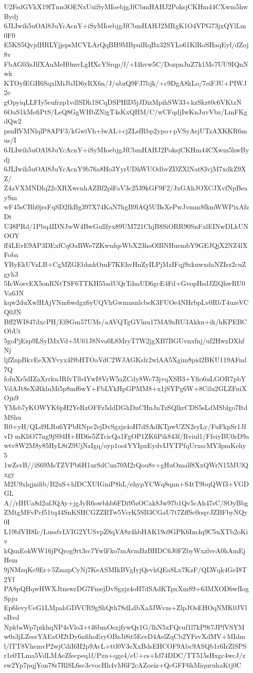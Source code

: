U2FsdGVkX19fTms3OENxUuiSyMIoebjgJfCbmHAHJ2PoksjCKHm44CXwm5hwBydj
6JLIwih5uOAl8JuYcAcnY+iSyMIoebjgJfCbmHAHJ2MRgK1O4VPG73jxQYlLm0F0
E5KS5QvjdHRLYjjspsMCVLArQqBH9MBpulRqBx32SYLo61KlRoSHaqEyf/dZoj8v
FbAG03zJlfXAuMeH0mvLgHXcYSrqp/f/+I4hvw5C/DozpnJnZ7k1Mc7UU9IQnNwk
KTOyfEGH6SqxlMiJbJD6yRX6n/J/ubzQ9FJ7bjk/+c9DgA8kLo/7eiFJU+PIWJ2e
gOpyiqLLFIy5eufrzp1vdlSDh1SCqDSPHlD5jJDizMpihSW33+kzSkzt0c6VKtzN
6OaS1kMefiPtS/LeQ8GgWHbZNigT4sKxQHM/C/wCFqdjIwKnJuvVbz/LmFKgdQw2
psnRVMNlqlP8APF3/kGwiVh+lwAL+cjZLsfRbp2ypo+pVSyAejUTzAXKKR6mus/I
6JLIwih5uOAl8JuYcAcnY+iSyMIoebjgJfCbmHAHJ2PoksjCKHm44CXwm5hwBydj
6JLIwih5uOAl8JuYcAcnY9b76a8Ho3YyrUDhWUOdbvZDZXlNat83vjM7xdkZ9XZ/
Z4aVXMNDlq22cXRXwcnhAZBf2plFaV3c2539kGF9F2/JxGAhJOXCJXvfNpBeaySm
wF45sCBh0jrsFqSD2fkBg397X74KaN7hgB9lAQ5UBsXePwJvmm8fkmWWPixAfzDt
U38PRd/1Pbq4IDNJwW4BwGullfyx89UM721ChjB8SiORR90SnFxlEINwDLkUNOOY
ff4LEvE9AP3DExfCqOaBWe7ZKwnfqsWbX23hoOlBNHuembY9GEJQjX2NZ4lXFoba
YByEkUVzLB+CgMZGEbhnkOmF7KEhvHnZyILPjMzIFqj9xkuwxdaNZIrz2cuZgyh3
5IcWosvEX5onRNtTSF6TTKH55adUQrTdmUD6gcE4Fd+GvopHsdJZlQhwRU0Va6JN
kqw2duXwlHAjVNm6wdgx6yUQVhGwmnsnlcbeK3FUOe4NHrbpLv0RbT4uzeVCQ0JN
Bff2WI847dxcPH/Ef8Gm57UMs/aAVQTgGVlnu17MA9aRU3Akkn+ik/hKPEBCObUt
5goPjEzp9LSyIMxVd+5U61J8Nva0L8MryT7W2jgXB7BGUvnxfnj/uf2HwzDXhfNj
ljfZnpBkvEeXXYvyx4l9bHTOaVdC2WJAGKsfr2wlAA5Xgim8pid2BKU119AFml7Q
fofuXr5dIZaXrrkuJRfvTlb4YwI8VrW5aZCdy8Wc73jvqXSB3+Yfio6uLGOR7pbY
VdAJt8eXiRkluMi5p8mf6wY+FbLYkHpGPMM8+x1jSYPg6W+8Cilu2GLZFniXOjn9
YMsb7yKOWYK6pH2YeRzOFFz5ddDGhDnCHnJnTzSQlkrCDS5sLdMSblgo7ItdMShu
R0+yH/QLd9LRu6YPbRNpc2ejDvSgzjz4oH7dSAdKTpwUZN2syLy/FuFkpSr1JfvD
mKliO77ng9jS94H+HD6s5ZTcicQa1FgOP1ZK6Pik843f/Rviul1/FfeiyBU0rD9a
wtv8W2M8y85HyL8tZ9UjNzIgq/oyp1ootYYIpxEydvIJYTPfqUrxscMY3pmKehy5
1wZsvB//iS69MsTZVPb6H1urSdCun70M2rQou8v+gHuOmalf8XxQWrN15MUlQxgy
M2U9xlqjnifib/B2uS+hlDCXUIGniP8hL/ehypYCWq8qnn+S4tT9bqQWf3+VGDGL
A//rIHUa8d2ufJQAy+jgJyR6owbhb6FDi95zOCak8Jw97b1Qv5cAh47sC/SOyBbg
ZMtgMFvPcf51tq44SnKSHCGZZRTw5VcrK5SB3CGaU7t7ZffSc0oqvJZBFbyNQy0I
L19bfVH8Ic/LussfvLVIG2YUSvpZ8qVA8z4hbHAK19o9GPK6Im4q9C5uXTb2oKiv
kQznEokWW16jPQrog9rt3rc7YwlFko7mAvmBzBHDC6J0FZbyWxzlveA0hAmEjHem
9jNMzqKe9Er+5ZmzpCyNj7KeASMIkBVgIyjQevhQEa8Lx7KzF/QLWqk4GcI8T2Yf
PA8pQHqwHWXJtnswrDG7FmejDvSgzjz4oH7dSAdKTpxXm89+63MXOD6wfIogSpju
Ep6levyUeG1LMpahGDVCR9gShQth78dLdbXa3JWvzs+ZlpJOsEHOqNMK0JVleBvd
NpkbsWp7pikhqNP4sVlo3+t46bmOsxjfywQr1G/lhN5xFQcuf1l7kP9t7JPfVSYM
w0z3jLZesrYAEaOI2tDy6nfihoEryOBzJi8it5EceD4AelZqCb2YFzvXdMV+MIdm
l/fTT8VhemvP2wjCdiI6H2p9AvL+ttl0V3eXxBdsEHCOF9Abc9ASQb1r6IrZlSPS
r1e0TLma5VdLMAeZfecpeq1f/Pzu+qge4/eU+cs+Id74DDC/TT515sHxgc4wcJ/z
rw2Yp7pqjYon78r7RlSL6sc3cvocHh4vM6F2cAZoeiz+QcGFF6hMiquruhaKtj0C
